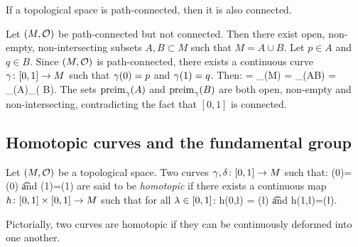 \bt
If a topological space is path-connected, then it is also connected.
\et

\bq
Let $(M,\mathcal{O})$ be path-connected but not connected. Then there exist open, non-empty, non-intersecting subsets $A,B\subset M$ such that $M=A\cup B$. Let $p \in A$ and $q \in B$. Since $(M,\mathcal{O})$ is path-connected, there exists a continuous curve $\gamma\colon[0,1]\to M$ such that $\gamma(0)=p$ and $\gamma(1)=q$. Then:
\bse
[0,1] = _\g(M) =  _\g(A\cup B) =  _\g(A)\cup  {}_\g( B).
\ese
The sets $\mathrm{preim}_\gamma(A)$ and $ \mathrm{preim}_\gamma( B)$ are both open, non-empty and non-intersecting, contradicting the fact that $[0,1]$ is connected.
\eq

\subsection{Homotopic curves and the fundamental group}

\bd
Let $(M,\mathcal{O})$ be a topological space. Two curves $\gamma,\delta\colon[0,1]\to M$ such that:
\bse
\g(0)=\delta(0) \quad \t{and} \quad \g(1)=\delta(1)
\ese
are said to be \emph{homotopic} if there exists a continuous map $h \colon [0,1]\times[0,1]\to M$ such that for all $\lambda \in [0,1]$:
\bse
h(0,\l) = \g(\l) \quad \t{and} \quad h(1,\l)=\delta(\l).
\ese
\ed

Pictorially, two curves are homotopic if they can be continuously deformed into one another.

\begin{figure}[h!]
\centering
{}
\end{figure}

